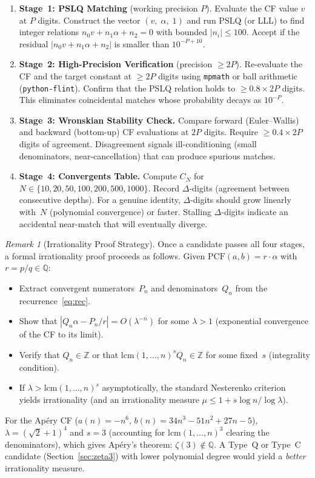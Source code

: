 \documentclass[11pt,a4paper]{article}
\theoremstyle{plain}
\theoremstyle{remark}
\newtheorem{remark}[theorem]{Remark}
\newcommand{\PCF}{\mathrm{PCF}}
\begin{document}
\begin{enumerate}
\item \textbf{Stage~1: PSLQ Matching} (working precision $P$).
  Evaluate the CF value $v$ at $P$ digits.
  Construct the vector $(v,\;\alpha,\;1)$ and run PSLQ
  (or LLL) to find integer relations $n_0 v + n_1\alpha + n_2 = 0$
  with bounded $|n_i| \le 100$.
  Accept if the residual $|n_0 v + n_1\alpha + n_2|$
  is smaller than $10^{-P+10}$.

\item \textbf{Stage~2: High-Precision Verification} (precision $\ge 2P$).
  Re-evaluate the CF and the target constant at $\ge 2P$ digits
  using \texttt{mpmath} or ball arithmetic (\texttt{python-flint}).
  Confirm that the PSLQ relation holds to $\ge 0.8 \times 2P$
  digits.  This eliminates coincidental matches whose probability
  decays as $10^{-P}$.

\item \textbf{Stage~3: Wronskian Stability Check.}
  Compare forward (Euler--Wallis) and backward (bottom-up)
  CF evaluations at $2P$ digits.
  Require $\ge 0.4 \times 2P$ digits of agreement.
  Disagreement signals ill-conditioning (small denominators,
  near-cancellation) that can produce spurious matches.

\item \textbf{Stage~4: Convergents Table.}
  Compute $C_N$ for $N \in \{10, 20, 50, 100, 200, 500, 1000\}$.
  Record $\Delta$-digits (agreement between consecutive depths).
  For a genuine identity, $\Delta$-digits should grow linearly
  with~$N$ (polynomial convergence) or faster.
  Stalling $\Delta$-digits indicate an accidental near-match
  that will eventually diverge.
\end{enumerate}

\begin{remark}[Irrationality Proof Strategy]
Once a candidate passes all four stages, a formal irrationality
proof proceeds as follows.
Given $\PCF(a,b) = r\cdot\alpha$ with $r = p/q \in \mathbb{Q}$:
\begin{itemize}
\item Extract convergent numerators~$P_n$ and denominators~$Q_n$
  from the recurrence~\eqref{eq:rec}.
\item Show that $|Q_n\alpha - P_n/r| = O(\lambda^{-n})$ for some
  $\lambda > 1$ (exponential convergence of the CF to its limit).
\item Verify that $Q_n \in \mathbb{Z}$ or that
  $\mathrm{lcm}(1,\ldots,n)^s Q_n \in \mathbb{Z}$
  for some fixed~$s$ (integrality condition).
\item If $\lambda > \mathrm{lcm}(1,\ldots,n)^s$ asymptotically,
  the standard Nesterenko criterion~\cite{nesterenko1996}
  yields irrationality (and an irrationality measure
  $\mu \le 1 + s\log n/\log\lambda$).
\end{itemize}
For the Ap\'ery CF ($a(n)=-n^6$, $b(n)=34n^3-51n^2+27n-5$),
$\lambda = (\sqrt{2}+1)^4$ and $s=3$ (accounting for
$\mathrm{lcm}(1,\ldots,n)^3$ clearing the denominators),
which gives Ap\'ery's theorem: $\zeta(3) \notin \mathbb{Q}$.
A Type~Q or Type~C candidate (Section~\ref{sec:zeta3}) with
lower polynomial degree would yield a \emph{better} irrationality
measure.
\end{remark}
\end{document}
